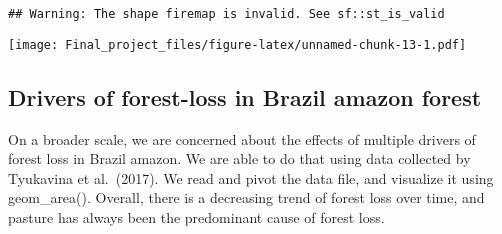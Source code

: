 \documentclass[
]{article}
\newenvironment{Shaded}{\begin{snugshade}}{\end{snugshade}}
\newcommand{\AttributeTok}[1]{\textcolor[rgb]{0.13,0.29,0.53}{#1}}
\newcommand{\ConstantTok}[1]{\textcolor[rgb]{0.56,0.35,0.01}{#1}}
\newcommand{\FloatTok}[1]{\textcolor[rgb]{0.00,0.00,0.81}{#1}}
\newcommand{\FunctionTok}[1]{\textcolor[rgb]{0.13,0.29,0.53}{\textbf{#1}}}
\newcommand{\NormalTok}[1]{#1}
\newcommand{\OtherTok}[1]{\textcolor[rgb]{0.56,0.35,0.01}{#1}}
\newcommand{\SpecialCharTok}[1]{\textcolor[rgb]{0.81,0.36,0.00}{\textbf{#1}}}
\newcommand{\StringTok}[1]{\textcolor[rgb]{0.31,0.60,0.02}{#1}}
\begin{document}
\begin{Shaded}
\end{Shaded}

\begin{verbatim}
## Warning: The shape firemap is invalid. See sf::st_is_valid
\end{verbatim}

\texttt{[image: Final\_project\_files/figure-latex/unnamed-chunk-13-1.pdf]}

\hypertarget{drivers-of-forest-loss-in-brazil-amazon-forest}{%
\subsection{Drivers of forest-loss in Brazil amazon
forest}\label{drivers-of-forest-loss-in-brazil-amazon-forest}}

On a broader scale, we are concerned about the effects of multiple
drivers of forest loss in Brazil amazon. We are able to do that using
data collected by Tyukavina et al.~(2017). We read and pivot the data
file, and visualize it using geom\_area(). Overall, there is a
decreasing trend of forest loss over time, and pasture has always been
the predominant cause of forest loss.
\end{document}
